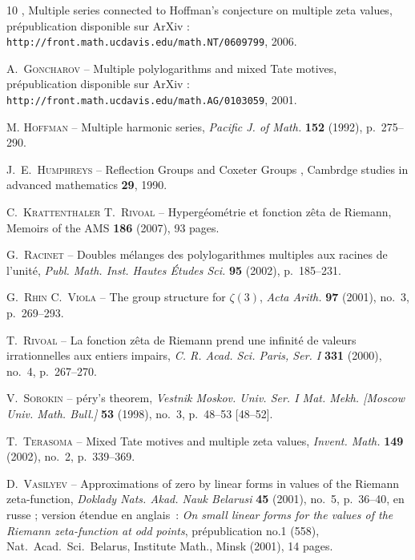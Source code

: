 \documentclass[12pt,francais, reqno]{smfart}
\numberwithin{equation}{section}
\begin{document}
\begin{thebibliography}{10}
\bysame , {\og Multiple series connected to Hoffman's conjecture on multiple zeta values\fg}, pr\'epublication disponible sur ArXiv : 
\\
{\tt{http\!\!://front.math.ucdavis.edu/math.NT/0609799}}, 2006.


{\scshape A.~Goncharov} -- {\og Multiple polylogarithms and mixed {T}ate
  motives\fg}, pr\'epublication disponible sur ArXiv :
  {\tt{http\!\!://front.math.ucdavis.edu/math.AG/0103059}}, 2001.

{\scshape M. Hoffman} -- {\og Multiple harmonic series\fg}, \emph{Pacific J. of Math.}
  \textbf{152} (1992), p.~275--290.
  
  {\scshape J.~E.~Humphreys} -- 
{\og Reflection Groups and Coxeter Groups \fg}, Cambrdge studies in advanced mathematics {\bf 29}, 1990.


{\scshape C.~Krattenthaler {\normalfont \smfandname} T.~Rivoal} -- {\og
  Hyperg\'eom\'etrie et fonction z\^eta de {R}iemann\fg}, Memoirs of the AMS
   \textbf{186} (2007), 93 pages. 

{\scshape G.~Racinet} -- {\og Doubles m\'elanges des polylogarithmes multiples
  aux racines de l'unit\'e\fg}, \emph{Publ. Math. Inst. Hautes \'Etudes Sci.}
  \textbf{95} (2002), p.~185--231.

{\scshape G.~Rhin {\normalfont \smfandname} C.~Viola} -- {\og The group
  structure for $\zeta(3)$\fg}, \emph{Acta Arith.} \textbf{97} (2001), no.~3,
  p.~269--293.

{\scshape T.~Rivoal} -- {\og La fonction z\^eta de {R}iemann prend une
  infinit{\'e} de valeurs irrationnelles aux entiers impairs\fg}, \emph{C. R.
  Acad. Sci. Paris, Ser. I} \textbf{331} (2000), no.~4, p.~267--270.

{\scshape V.~Sorokin} -- {p{\'e}ry's theorem\fg}, \emph{Vestnik Moskov.
  Univ. Ser. I Mat. Mekh. [Moscow Univ. Math. Bull.]} \textbf{53} (1998),
  no.~3, p.~48--53 [48--52].
   
  
{\scshape T.~Terasoma} -- {\og Mixed {T}ate motives and multiple zeta
  values\fg}, \emph{Invent. Math.} \textbf{149} (2002), no.~2, p.~339--369.

{\scshape D.~Vasilyev} -- {\og Approximations of zero by linear forms in values
  of the {R}iemann zeta-function\fg}, \emph{Doklady Nats. Akad. Nauk Belarusi}
  \textbf{45} (2001), no.~5, p.~36--40, en russe ; version {\'e}tendue en
  anglais~: {\em On small linear forms for the values of the Riemann
  zeta-function at odd points}, pr{\'e}publication no.1 (558), Nat.\ Acad.\
  Sci.\ Belarus, Institute Math., Minsk (2001), 14 pages.


\end{thebibliography}
\end{document}
